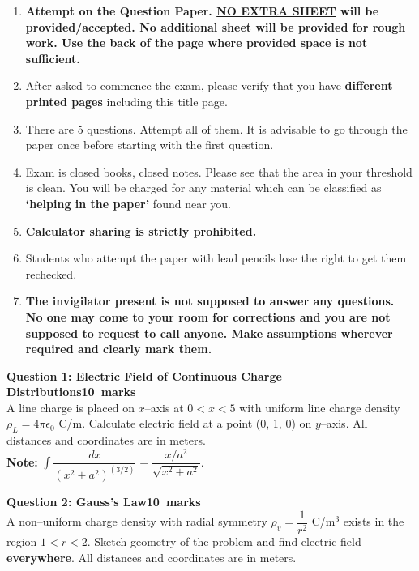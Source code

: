 \documentclass[12pt,a4paper]{article}
\def\QOne{10}
\def\Qtwo{10}
\begin{document}
\begin{enumerate}
\item \textbf{Attempt on the Question Paper. \underline{NO EXTRA SHEET} will be provided/accepted. No
additional sheet will be provided for rough work. Use the back of the page where
provided space is not sufficient.}
\item After asked to commence the exam, please verify that you have \textbf{\pageref{LastPage} different
printed pages} including this title page.
\item There are 5 questions. Attempt all of them. It is advisable to go through the paper once
before starting with the first question.
\item Exam is closed books, closed notes. Please see that the area in your threshold is clean.
You will be charged for any material which can be classified as \textbf{`helping in the paper'}
found near you.
\item \textbf{Calculator sharing is strictly prohibited.}
\item Students who attempt the paper with lead pencils lose the right to get them rechecked.
\item \textbf{The invigilator present is not supposed to answer any questions. No one may come
to your room for corrections and you are not supposed to request to call anyone.
Make assumptions wherever required and clearly mark them.}
\end{enumerate}
\newpage
\noindent\textbf{Question 1: Electric Field of Continuous Charge Distributions\hfill \QOne~marks}\\
A line charge is placed on $x$--axis at $0<x<5$ with uniform line charge density $\rho_L=4\pi\epsilon_0$ C/m. Calculate electric field at a point (0, 1, 0) on $y$--axis. All distances and coordinates are in meters.\\
\textbf{Note:} $\int\dfrac{dx}{(x^2+a^2)^{(3/2)}}=\dfrac{x/a^2}{\sqrt{x^2+a^2}}$.
\begin{figure}[H]
\end{figure}

\noindent \textbf{Question 2: Gauss's Law\hfill \Qtwo~marks}\\
A non--uniform charge density with radial symmetry $\rho_v=\dfrac{1}{r^2}$ C/m$^3$ exists in the region $1<r<2$. Sketch geometry of the problem and find electric field \textbf{everywhere}. All distances and coordinates are in meters.
\begin{figure}[H]
\end{figure}
\end{document}
